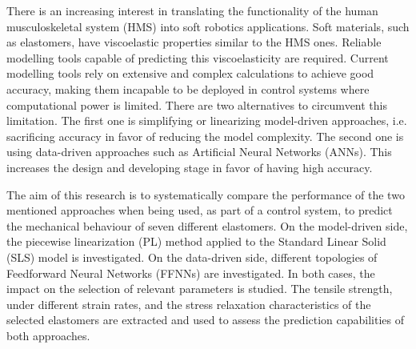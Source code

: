 


\begin{abstracts}        %


There is an increasing interest in translating the functionality of the human musculoskeletal system (HMS) into soft robotics applications. Soft materials, such as elastomers, have viscoelastic properties similar to the HMS ones. Reliable modelling tools capable of predicting this viscoelasticity are required. Current modelling tools rely on extensive and complex calculations to achieve good accuracy, making them incapable to be deployed in control systems where computational power is limited. There are two alternatives to circumvent this limitation. The first one is simplifying or linearizing model-driven approaches, i.e. sacrificing accuracy in favor of reducing the model complexity. The second one is using data-driven approaches such as  Artificial Neural Networks (ANNs). This increases the design and developing stage in favor of having high accuracy. 

The aim of this research is to systematically compare the performance of the two mentioned approaches when being used, as part of a control system, to predict the mechanical behaviour of seven different elastomers. On the model-driven side, the piecewise linearization (PL) method applied to the Standard Linear Solid (SLS) model is investigated. On the data-driven side, different topologies of Feedforward Neural Networks (FFNNs) are investigated. In both cases, the impact on the selection of relevant parameters is studied. The tensile strength, under different strain rates, and the stress relaxation characteristics of the selected elastomers are extracted and used to assess the prediction capabilities of both approaches. 



\end{abstracts}
